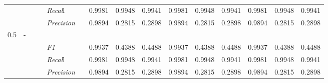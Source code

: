 \begin{table}[]
\begin{tabularx}{\textwidth}{XXlllllllllllll@{}}
                                                                    &                                                                     &                                                           &    & \textit{Recal}l &                                                      & 0.9981    & 0.9948    & 0.9941    & 0.9981    & 0.9948    & 0.9941    & 0.9981    & 0.9948    & 0.9941    \\
                                                                    &                                                                     &                                                           &    & \textit{Precision} &                                                      & 0.9894 & 0.2815 & 0.2898 & 0.9894 & 0.2815 & 0.2898 & 0.9894 & 0.2815 & 0.2898 \\ \midrule
0.5 & - &  &  &                                                              &                                                                   &                                                             &                                                               &                                                                    &                                                              &                                                               &                                                                    &                                                              \\
                                                                    &                                                                     &                                                           &    & \textit{F1} &                                                      & 0.9937        & 0.4388        & 0.4488        & 0.9937        & 0.4388        & 0.4488        & 0.9937        & 0.4388        & 0.4488        \\
                                                                    &                                                                     &                                                           &    & \textit{Recal}l &                                                      & 0.9981    & 0.9948    & 0.9941    & 0.9981    & 0.9948    & 0.9941    & 0.9981    & 0.9948    & 0.9941    \\
                                                                    &                                                                     &                                                           &    & \textit{Precision} &                                                      & 0.9894 & 0.2815 & 0.2898 & 0.9894 & 0.2815 & 0.2898 & 0.9894 & 0.2815 & 0.2898 \\ \midrule

\end{tabularx}
\end{table}

